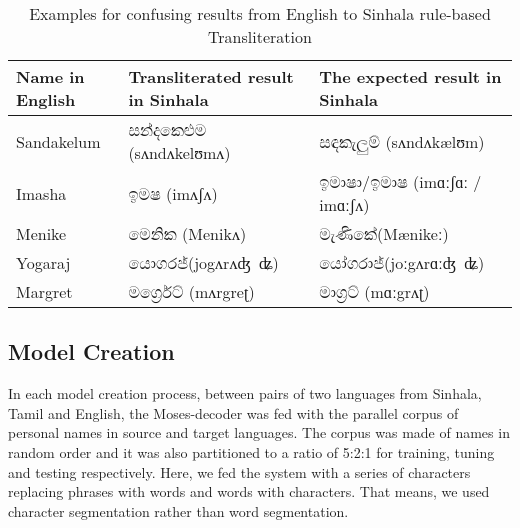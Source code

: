 \documentclass[10pt, a4paper, conference, compsocconf]{IEEEtran}
\begin{document}
\begin{table}
    \caption{Examples for confusing results from English to Sinhala rule-based Transliteration}
    \begin{tabularx}{\columnwidth}{X|X|X}
        \hline
        Name in English  &  Transliterated result in Sinhala & The expected result in Sinhala\\
        
        \hline
        Sandakelum   &   {\sifont සන්දකෙළුම} \newline (sʌndʌkelʊmʌ) & {\sifont සඳකැලුම්} \newline (sʌndʌkælʊm)\\
        \hline
    	Imasha    &   {\sifont ඉමෂ} \newline (imʌʃʌ) & {\sifont ඉමාෂා}/{\sifont ඉමාෂ} \newline (imɑːʃɑː / imɑːʃʌ)\\
    	\hline
    	Menike  &   {\sifont මෙනික} \newline (Menikʌ) & {\sifont මැණිකේ}\newline (Mænikeː)\\
    	\hline
    	Yogaraj  &   {\sifont යොගරජ්}\newline (jogʌrʌʤ~ʥ) & {\sifont යෝගරාජ්}\newline(joːgʌrɑːʤ~ʥ)\\
    	\hline  
    	Margret & {\sifont මර්ග්‍රෙට්} \newline (mʌrgreʈ) & {\sifont මාග්‍රට්} \newline (mɑːgrʌʈ)\\
        \hline
    \end{tabularx}
    \label{table: table 1}
\end{table}

\subsection{Model Creation}
In each model creation process, between pairs of two languages from Sinhala, Tamil and English, the Moses-decoder was fed with the parallel corpus of personal names in source and target languages. The corpus was made of names in random order and it was also partitioned to a ratio of 5:2:1 for training, tuning and testing respectively. Here, we fed the system with a series of characters replacing phrases with words and words with characters. That means, we used character segmentation rather than word segmentation.
\end{document}
